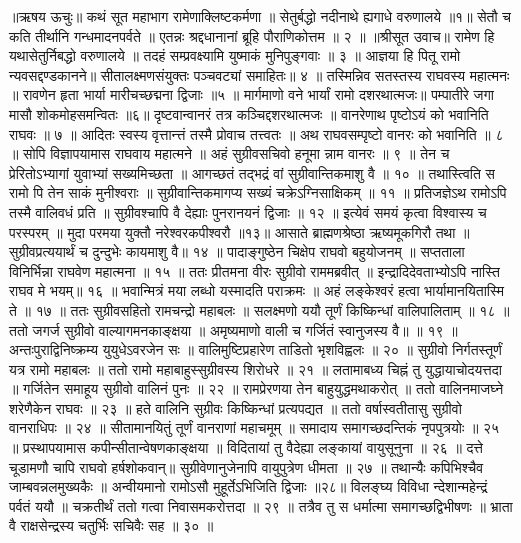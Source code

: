॥ऋषय ऊचुः॥
कथं सूत महाभाग रामेणाक्लिष्टकर्मणा ॥
सेतुर्बद्धो नदीनाथे ह्यगाधे वरुणालये ॥१॥
सेतौ च कति तीर्थानि गन्धमादनपर्वते ॥
एतन्नः श्रद्दधानानां ब्रूहि पौराणिकोत्तम ॥ २ ॥
॥श्रीसूत उवाच॥
रामेण हि यथासेतुर्निबद्धो वरुणालये ॥
तदहं सम्प्रवक्ष्यामि युष्माकं मुनिपुङ्गवाः ॥ ३ ॥
आज्ञया हि पितू रामो न्यवसद्दण्डकानने॥
सीतालक्ष्मणसंयुक्तः पञ्चवट्यां समाहितः॥ ४ ॥
तस्मिन्निव सतस्तस्य राघवस्य महात्मनः ॥
रावणेन हृता भार्या मारीचच्छद्मना द्विजाः ॥५ ॥
मार्गमाणो वने भार्यां रामो दशरथात्मजः॥
पम्पातीरे जगा मासौ शोकमोहसमन्वितः ॥६॥
दृष्टवान्वानरं तत्र कञ्चिद्दशरथात्मजः ॥
वानरेणाथ पृष्टोऽयं को भवानिति राघवः ॥ ७ ॥
आदितः स्वस्य वृत्तान्त्तं तस्मै प्रोवाच तत्त्वतः ॥
अथ राघवसम्पृष्टो वानरः को भवानिति ॥ ८ ॥
सोपि विज्ञापयामास राघवाय महात्मने ॥
अहं सुग्रीवसचिवो हनूमा न्नाम वानरः ॥ ९ ॥
तेन च प्रेरितोऽभ्यागां युवाभ्यां सख्यमिच्छता ॥
आगच्छतं तद्भद्रं वां सुग्रीवान्तिकमाशु वै ॥ १० ॥
तथास्त्विति स रामो पि तेन साकं मुनीश्वराः ॥
सुग्रीवान्तिकमागप्य सख्यं चक्रेऽग्निसाक्षिकम् ॥ ११ ॥
प्रतिजज्ञेऽथ रामोऽपि तस्मै वालिवधं प्रति ॥
सुग्रीवश्चापि वै देह्याः पुनरानयनं द्विजाः ॥ १२ ॥
इत्येवं समयं कृत्वा विश्वास्य च परस्परम् ॥
मुदा परमया युक्तौ नरेश्वरकपीश्वरौ ॥१३॥
आसाते ब्राह्मणश्रेष्ठा ऋष्यमूकगिरौ तथा ॥
सुग्रीवप्रत्ययार्थं च दुन्दुभेः कायमाशु वै॥ १४ ॥
पादाङ्गुष्ठेन चिक्षेप राघवो बहुयोजनम् ॥
सप्तताला विनिर्भिन्ना राघवेण महात्मना ॥ १५ ॥
ततः प्रीतमना वीरः सुग्रीवो राममब्रवीत् ॥
इन्द्रादिदेवताभ्योऽपि नास्ति राघव मे भयम्॥ १६ ॥
भवान्मित्रं मया लब्धो यस्मादति पराक्रमः ॥
अहं लङ्केश्वरं हत्वा भार्यामानयितास्मि ते ॥ १७ ॥
ततः सुग्रीवसहितो रामचन्द्रो महाबलः ॥
सलक्ष्मणो ययौ तूर्णं किष्किन्धां वालिपालिताम् ॥ १८ ॥
ततो जगर्ज सुग्रीवो वाल्यागमनकाङ्क्षया ॥
अमृष्यमाणो वाली च गर्जितं स्वानुजस्य वै॥ ॥ १९ ॥
अन्तःपुराद्विनिष्क्रम्य युयुधेऽवरजेन सः ॥
वालिमुष्टिप्रहारेण ताडितो भृशविह्वलः ॥ २० ॥
सुग्रीवो निर्गतस्तूर्णं यत्र रामो महाबलः ॥
ततो रामो महाबाहुस्सुग्रीवस्य शिरोधरे ॥ २१ ॥
लतामाबध्य चिह्नं तु युद्धायाचोदयत्तदा ॥
गर्जितेन समाहूय सुग्रीवो वालिनं पुनः ॥ २२ ॥
रामप्रेरणया तेन बाहुयुद्धमथाकरोत् ॥
ततो वालिनमाजघ्ने शरेणैकेन राघवः ॥ २३ ॥
हते वालिनि सुग्रीवः किष्किन्धां प्रत्यपद्यत ॥
ततो वर्षास्वतीतासु सुग्रीवो वानराधिपः ॥ २४ ॥
सीतामानयितुं तूर्णं वानराणां महाचमूम् ॥
समादाय समागच्छदन्तिकं नृपपुत्रयोः ॥ २५ ॥
प्रस्थापयामास कपीन्सीतान्वेषणकाङ्क्षया ॥
विदितायां तु वैदेह्या लङ्कायां वायुसूनुना ॥ २६ ॥
दत्ते चूडामणौ चापि राघवो हर्षशोकवान्॥
सुग्रीवेणानुजेनापि वायुपुत्रेण धीमता ॥ २७ ॥
तथान्यैः कपिभिश्चैव जाम्बवन्नलमुख्यकैः ॥
अन्वीयमानो रामोऽसौ मुहूर्तेऽभिजिति द्विजाः ॥२८॥
विलङ्घ्य विविधा न्देशान्महेन्द्रं पर्वतं ययौ ॥
चक्रतीर्थं ततो गत्वा निवासमकरोत्तदा ॥ २९ ॥
तत्रैव तु स धर्मात्मा समागच्छद्विभीषणः ॥
भ्राता वै राक्षसेन्द्रस्य चतुर्भिः सचिवैः सह ॥ ३० ॥
